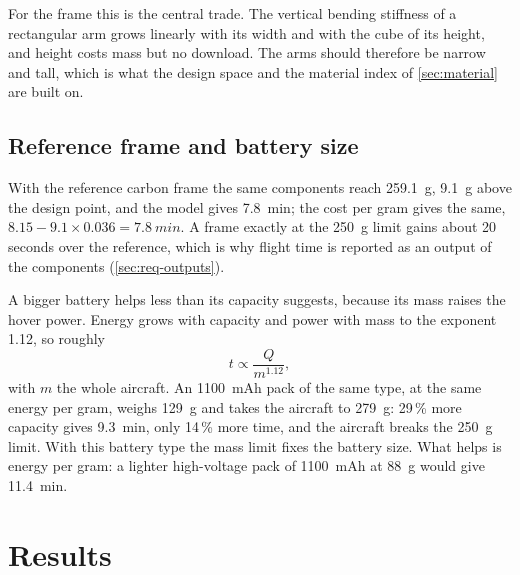 For the frame this is the central trade. The vertical bending stiffness of a rectangular arm grows linearly with its width and with the cube of its height, and height costs mass but no download. The arms should therefore be narrow and tall, which is what the design space and the material index of \cref{sec:material} are built on.

\subsection{Reference frame and battery size}

With the reference carbon frame the same components reach \SI{259.1}{g}, \SI{9.1}{g} above the design point, and the model gives \SI{7.8}{min}; the cost per gram gives the same, $8.15 - 9.1 \times 0.036 = \SI{7.8}{min}$. A frame exactly at the \SI{250}{g} limit gains about 20 seconds over the reference, which is why flight time is reported as an output of the components (\cref{sec:req-outputs}).

A bigger battery helps less than its capacity suggests, because its mass raises the hover power. Energy grows with capacity and power with mass to the exponent 1.12, so roughly
\begin{equation}
t \propto \frac{Q}{m^{1.12}},
\end{equation}
with $m$ the whole aircraft. An \SI{1100}{mAh} pack of the same type, at the same energy per gram, weighs \SI{129}{g} and takes the aircraft to \SI{279}{g}: 29\,\% more capacity gives \SI{9.3}{min}, only 14\,\% more time, and the aircraft breaks the \SI{250}{g} limit. With this battery type the mass limit fixes the battery size. What helps is energy per gram: a lighter high-voltage pack of \SI{1100}{mAh} at \SI{88}{g} would give \SI{11.4}{min}.

\section{Results}\label{sec:sizing-results}

